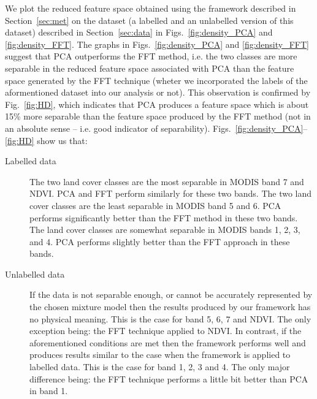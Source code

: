 \documentclass{article}
\begin{document}
We plot the reduced feature space obtained using the framework described in Section~\ref{sec:met} on the dataset (a labelled and an unlabelled version of this dataset) described in Section~\ref{sec:data} in Figs.~\ref{fig:density_PCA} and \ref{fig:density_FFT}. The graphs in Figs.~\ref{fig:density_PCA} and \ref{fig:density_FFT} suggest that PCA outperforms the FFT method, i.e. the two 
classes are more separable in the reduced feature space associated with PCA than the feature space generated by the FFT technique (wheter we incorporated the labels of the aformentioned dataset into our analysis or not). This observation is confirmed 
by Fig.~\ref{fig:HD}, which indicates that PCA produces a feature space which is about 15\% more separable than the feature space produced by the FFT method (not in an absolute sense -- i.e. good indicator of separability). Figs.~\ref{fig:density_PCA}--\ref{fig:HD} show us that:
\begin{description}
 \item[Labelled data] The two land cover classes are the most separable in MODIS band 7 and NDVI. PCA and FFT perform similarly for these two bands. The two land cover classes are the least separable in MODIS band 5 and 6. PCA performs significantly better than the FFT method in these two bands.
 The land cover classes are somewhat separable in MODIS bands 1, 2, 3, and 4. PCA performs slightly better than the FFT approach in these bands. 
 \item[Unlabelled data]  
 If the data is not separable enough, or cannot be accurately represented by the chosen mixture model then the results produced by our framework has no physical meaning. This is the case for band 5, 6, 7 and NDVI. The only 
 exception being: the FFT technique applied to NDVI. In contrast, if the aforementioned conditions are met then the framework performs well and produces results similar to the case when the framework is applied to labelled data. This is the case for band
 1, 2, 3 and 4. The only major difference being: the FFT technique performs a little bit better than PCA in band 1.
\end{description}
\end{document}
